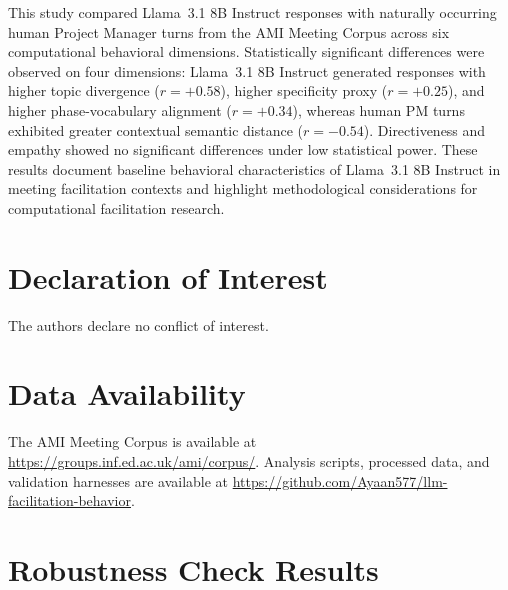 \documentclass[preprint,12pt,authoryear]{elsarticle}
\begin{document}
This study compared Llama~3.1 8B Instruct responses with naturally occurring human Project Manager turns from the AMI Meeting Corpus across six computational behavioral dimensions. Statistically significant differences were observed on four dimensions: Llama~3.1 8B Instruct generated responses with higher topic divergence ($r = +0.58$), higher specificity proxy ($r = +0.25$), and higher phase-vocabulary alignment ($r = +0.34$), whereas human PM turns exhibited greater contextual semantic distance ($r = -0.54$). Directiveness and empathy showed no significant differences under low statistical power. These results document baseline behavioral characteristics of Llama~3.1 8B Instruct in meeting facilitation contexts and highlight methodological considerations for computational facilitation research.

\section*{Declaration of Interest}
The authors declare no conflict of interest.

\section*{Data Availability}
The AMI Meeting Corpus is available at \url{https://groups.inf.ed.ac.uk/ami/corpus/}. Analysis scripts, processed data, and validation harnesses are available at \url{https://github.com/Ayaan577/llm-facilitation-behavior}.



\appendix
\section{Robustness Check Results}
\label{app:robustness}
\end{document}
